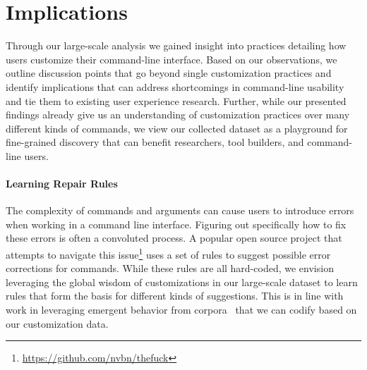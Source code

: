 \section{Implications}

Through our large-scale analysis 
we gained insight into practices detailing how users customize their command-line interface.
Based on our observations, we outline discussion points that go beyond single customization practices and identify implications that can address shortcomings in command-line usability and tie them to existing user experience research.
Further, while our presented findings already give us an understanding of customization practices over many different kinds of commands, we view our collected dataset as a playground for fine-grained discovery that can benefit researchers, tool builders, and command-line users.

\paragraph*{\bf Learning Repair Rules}

The complexity of commands and arguments can cause users to introduce errors when working in a command line interface.
Figuring out specifically how to fix these errors is often a convoluted process.
A popular open source project that attempts to navigate this issue\footnote{\url{https://github.com/nvbn/thefuck}} uses a set of rules to suggest possible error corrections for commands.
While these rules are all hard-coded, we envision leveraging the global wisdom of customizations in our large-scale dataset to learn rules that form the basis for different kinds of suggestions.
This is in line with work in leveraging emergent behavior from corpora~\cite{fast:14} that we can codify based on our customization data.

